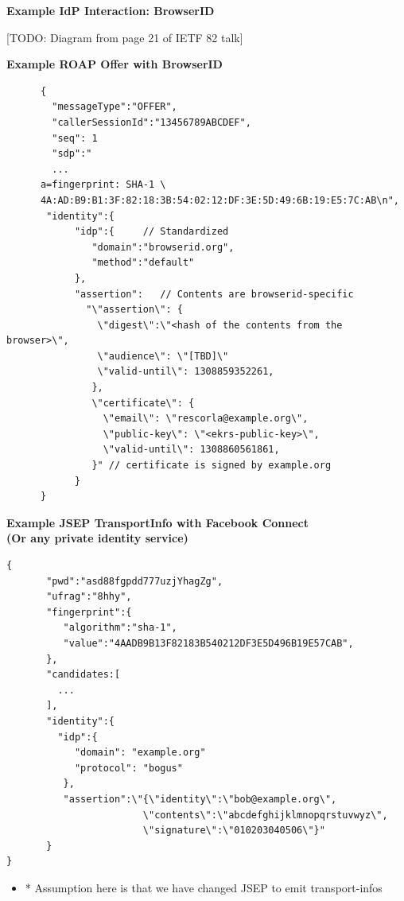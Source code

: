 \documentclass[helvetica]{seminar}
\newcommand{\heading}[1]{%
  \begin{center} 
    \large\bf 
    #1 
  \end{center} 
  \vspace{.4 in}}
\begin{document}
\begin{slide}
\heading{Example IdP Interaction: BrowserID}

[TODO: Diagram from page 21 of IETF 82 talk]

\end{slide}

\begin{slide}
\heading{Example ROAP Offer with BrowserID}

\begin{tiny}
\begin{verbatim}
      {
        "messageType":"OFFER",
        "callerSessionId":"13456789ABCDEF",
        "seq": 1
        "sdp":"
        ...
      a=fingerprint: SHA-1 \
      4A:AD:B9:B1:3F:82:18:3B:54:02:12:DF:3E:5D:49:6B:19:E5:7C:AB\n",
       "identity":{
            "idp":{     // Standardized
               "domain":"browserid.org",
               "method":"default"
            },
            "assertion":   // Contents are browserid-specific
              "\"assertion\": {
                \"digest\":\"<hash of the contents from the browser>\",
                \"audience\": \"[TBD]\"
                \"valid-until\": 1308859352261,
               },
               \"certificate\": {
                 \"email\": \"rescorla@example.org\",
                 \"public-key\": \"<ekrs-public-key>\",
                 \"valid-until\": 1308860561861,
               }" // certificate is signed by example.org
            }
      }
\end{verbatim}
\end{tiny}
\end{slide}



\begin{slide}
\heading{Example JSEP TransportInfo with Facebook Connect\\(Or any private identity service)}

\vspace{-.3in}
\begin{tiny}
\begin{verbatim}
{
       "pwd":"asd88fgpdd777uzjYhagZg",
       "ufrag":"8hhy",
       "fingerprint":{
          "algorithm":"sha-1",
          "value":"4AADB9B13F82183B540212DF3E5D496B19E57CAB",
       },
       "candidates:[
         ...
       ],
       "identity":{
         "idp":{
            "domain": "example.org"
            "protocol": "bogus"
          },
          "assertion":\"{\"identity\":\"bob@example.org\",
                        \"contents\":\"abcdefghijklmnopqrstuvwyz\",
                        \"signature\":\"010203040506\"}"
       }
}
\end{verbatim}
\end{tiny}                      

\begin{itemize}
\item[] * Assumption here is that we have changed JSEP to emit transport-infos
\end{itemize}

\end{slide}
\end{document}
